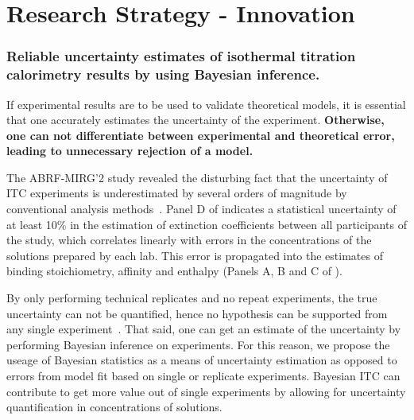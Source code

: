 \documentclass[10pt,final]{article}
\newif\ifinstr
\newcommand{\instr}[1]{\ifdraft{\ifinstr {\color{cyan}\emph{#1}} \fi}{}}
\begin{document}




\section*{Research Strategy - Innovation}
\instr{Explain how your proposal differs from what others have tried.}
\subsubsection*{Reliable uncertainty estimates of isothermal titration calorimetry results by using Bayesian inference.}
If experimental results are to be used to validate theoretical models, it is essential that one accurately estimates the uncertainty of the experiment. 
%
\textbf{Otherwise, one can not differentiate between experimental and theoretical error, leading to unnecessary rejection of a model. }


The ABRF-MIRG'2 study revealed the disturbing fact that the uncertainty of ITC experiments is underestimated by several orders of magnitude by conventional analysis methods~\autocite{Myszka2003a}.
%
Panel D of  indicates a statistical uncertainty of at least 10\% in the estimation of extinction coefficients between all participants of the study, which correlates linearly with errors in the concentrations of the solutions prepared by each lab. 
%
This error is propagated into the estimates of binding stoichiometry, affinity and enthalpy  (Panels A, B and C of ).

By only performing technical replicates  and no repeat experiments, the true uncertainty can not be quantified, hence no hypothesis can be supported from any single experiment~\autocite{Vaux2012a}.
%
That said, one can get an estimate of the uncertainty by performing Bayesian inference on experiments.
%
For this reason, we propose the useage of Bayesian statistics as a means of uncertainty estimation as opposed to errors from model fit based on single or replicate experiments.
%
Bayesian ITC can contribute to get more value out of single experiments by allowing for uncertainty quantification in concentrations of solutions. 
\end{document}
